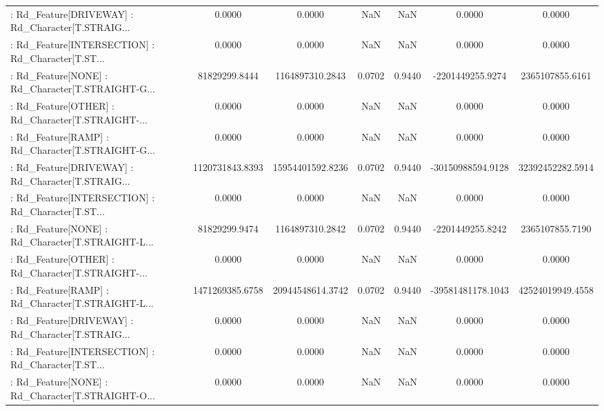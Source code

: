 \begin{longtable}{p{4cm}cccccc}
 : Rd\_Feature[DRIVEWAY] : Rd\_Character[T.STRAIG... &            0.0000 &            0.0000 &     NaN &          NaN &             0.0000 &            0.0000 \\
 : Rd\_Feature[INTERSECTION] : Rd\_Character[T.ST... &            0.0000 &            0.0000 &     NaN &          NaN &             0.0000 &            0.0000 \\
 : Rd\_Feature[NONE] : Rd\_Character[T.STRAIGHT-G... &     81829299.8444 &   1164897310.2843 &  0.0702 &       0.9440 &   -2201449255.9274 &   2365107855.6161 \\
 : Rd\_Feature[OTHER] : Rd\_Character[T.STRAIGHT-... &            0.0000 &            0.0000 &     NaN &          NaN &             0.0000 &            0.0000 \\
 : Rd\_Feature[RAMP] : Rd\_Character[T.STRAIGHT-G... &            0.0000 &            0.0000 &     NaN &          NaN &             0.0000 &            0.0000 \\
 : Rd\_Feature[DRIVEWAY] : Rd\_Character[T.STRAIG... &   1120731843.8393 &  15954401592.8236 &  0.0702 &       0.9440 &  -30150988594.9128 &  32392452282.5914 \\
 : Rd\_Feature[INTERSECTION] : Rd\_Character[T.ST... &            0.0000 &            0.0000 &     NaN &          NaN &             0.0000 &            0.0000 \\
 : Rd\_Feature[NONE] : Rd\_Character[T.STRAIGHT-L... &     81829299.9474 &   1164897310.2842 &  0.0702 &       0.9440 &   -2201449255.8242 &   2365107855.7190 \\
 : Rd\_Feature[OTHER] : Rd\_Character[T.STRAIGHT-... &            0.0000 &            0.0000 &     NaN &          NaN &             0.0000 &            0.0000 \\
 : Rd\_Feature[RAMP] : Rd\_Character[T.STRAIGHT-L... &   1471269385.6758 &  20944548614.3742 &  0.0702 &       0.9440 &  -39581481178.1043 &  42524019949.4558 \\
 : Rd\_Feature[DRIVEWAY] : Rd\_Character[T.STRAIG... &            0.0000 &            0.0000 &     NaN &          NaN &             0.0000 &            0.0000 \\
 : Rd\_Feature[INTERSECTION] : Rd\_Character[T.ST... &            0.0000 &            0.0000 &     NaN &          NaN &             0.0000 &            0.0000 \\
 : Rd\_Feature[NONE] : Rd\_Character[T.STRAIGHT-O... &            0.0000 &            0.0000 &     NaN &          NaN &             0.0000 &            0.0000 \\

\end{longtable}
